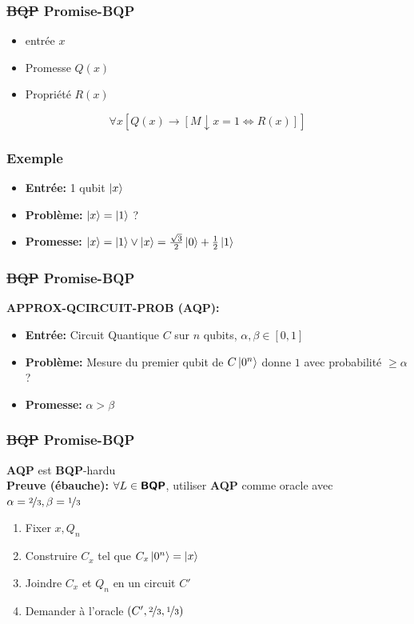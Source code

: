 \documentclass{beamer}
\newcommand{\bqp}{\textsf{\textbf{BQP}}}
\begin{document}
\begin{frame}
  \frametitle{\sout{\bqp} Promise-\bqp}

  \begin{itemize}
    \item entr\'ee $x$
    \item Promesse $Q(x)$
    \item Propri\'et\'e $R(x)$
  \end{itemize}
  \[\forall x[Q(x) \rightarrow [M \downarrow x = 1 \iff R(x)]]\]
\end{frame}

\begin{frame}
  \frametitle{Exemple}

  \begin{itemize}
    \item \textbf{Entr\'ee:} 1 qubit $\ket{x}$
    \item \textbf{Probl\`eme:} $\ket{x} = \ket{1}$ ? \pause
    \item \textbf{Promesse:} $\ket{x} = \ket{1} \lor \ket{x} = \frac{\sqrt{3}}{2} \ket{0} + \frac{1}{2} \ket{1}$
  \end{itemize}
\end{frame}

\begin{frame}
  \frametitle{\sout{\bqp} Promise-\bqp}

  \textbf{APPROX-QCIRCUIT-PROB (AQP):}
  \begin{itemize}
    \item \textbf{Entr\'ee:} Circuit Quantique $C$ sur $n$ qubits, $\alpha, \beta \in [0,1]$ \pause
    \item \textbf{Probl\`eme:} Mesure du premier qubit de $C\ket{0^n}$ donne $1$ avec probabilit\'e $\geq \alpha$? \pause
    \item \textbf{Promesse:} $\alpha > \beta$
  \end{itemize}

\end{frame}

\begin{frame}
  \frametitle{\sout{\bqp} Promise-\bqp}

  \textbf{AQP} est \bqp-hardu\\
  \textbf{Preuve (\'ebauche):}
  $\forall L \in \bqp$, utiliser \textbf{AQP} comme oracle avec $\alpha=\nicefrac{2}{3}, \beta=\nicefrac{1}{3}$
  \begin{enumerate}
    \item Fixer $x, Q_n$
    \item Construire $C_x$ tel que $C_x \ket{0^n}=\ket{x}$
    \item Joindre $C_x$ et $Q_n$ en un circuit $C'$
    \item Demander \`a l'oracle $(C', \nicefrac{2}{3}, \nicefrac{1}{3})$
  \end{enumerate}

\end{frame}
\end{document}
